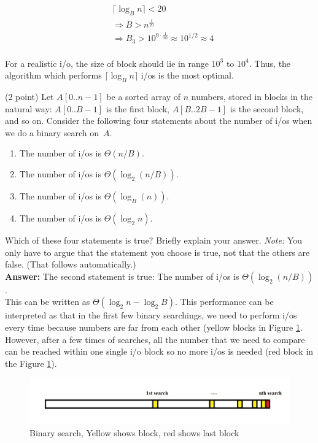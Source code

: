 \documentclass{article}
\newcommand{\io}{{\sc i/o}\xspace}
\newcommand{\ios}{{\io}s\xspace}
\newcounter{rcounter}
\newenvironment{rlist}%
{\begin{list}{\setnr-\arabic{rcounter}}{\usecounter{rcounter}}}{\end{list}}
\begin{document}
\begin{rlist}
\begin{enumerate}
            \begin{align*}
            &\lceil \log_B n \rceil < 20\\
            &\Longrightarrow B > n^{\frac{1}{20}}\\
            &\Longrightarrow B_3 > 10^{9 \cdot \frac{1}{20}} \approx 10^{1/2} \approx 4\\
            \end{align*}
        \end{enumerate}
        For a realistic \io, the size of block should lie in range $10^3$ to $10^4$. Thus, the algorithm which performs $\lceil \log_B n \rceil$ \ios is the most optimal.
        \item ($2$ point)
        Let $A[0..n-1]$ be a sorted array of $n$ numbers, stored in blocks in the natural
        way: $A[0..B-1]$ is the first block, $A[B..2B-1]$ is the second block, and so on.
        Consider the following four statements about the number of \ios when we
        do a binary search on~$A$.
        \begin{enumerate}
            \item[(I)]
            The number of \ios is $\Theta(n/B)$.
            \item[(II)]
            The number of \ios is $\Theta(\log_2 (n/B))$.
            \item[(III)]
            The number of \ios is $\Theta(\log_B(n))$.
            \item[(IV)]
            The number of \ios is $\Theta(\log_2 n)$.
        \end{enumerate}
        Which of these four statements is true? Briefly explain your answer. \emph{Note:} You only have to argue that the statement you choose is true, not that the others are false. (That follows automatically.)\\
        \textbf{Answer:}
        The second statement is true: The number of \ios is $\Theta(\log_2 (n/B))$.\\
        This can be written as $\Theta(\log_2n-\log_2B)$. This performance can be interpreted as that in the first few binary searchings, we need to perform \ios every time because numbers are far from each other (yellow blocks in Figure \ref{fig:bs}. However, after a few times of searches, all the number that we need to compare can be reached within one single \io block so no more \ios is needed (red block in the Figure \ref{fig:bs}).
        \begin{figure}[h]
            \includegraphics[width=\linewidth]{figs/I_2.jpg}
            \caption{Binary search, Yellow shows block, red shows last block}
            \label{fig:bs}
        \end{figure}
        

\end{rlist}
\end{document}
